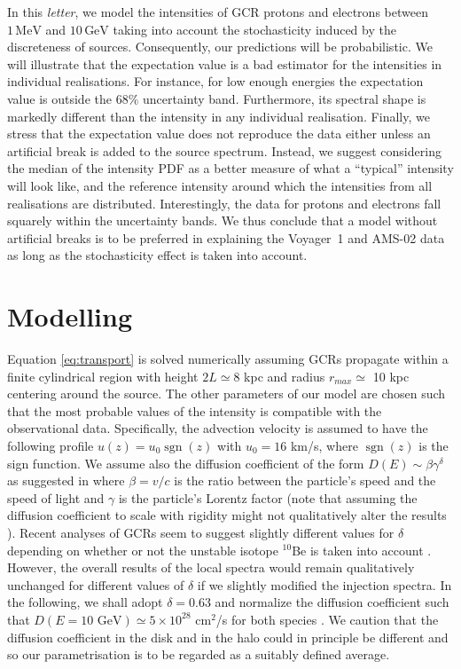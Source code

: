 \documentclass[%
reprint,
amsmath,amssymb,
aps,
superscriptaddress,
preprintnumbers
]{revtex4-2}
\DeclareMathOperator{\sgn}{sgn}
\begin{document}
In this \emph{letter}, we model the intensities of GCR protons and electrons between $1 \, \text{MeV}$ and $10 \, \text{GeV}$ taking into account the stochasticity induced by the discreteness of sources. Consequently, our predictions will be probabilistic. We will illustrate that the expectation value is a bad estimator for the intensities in individual realisations. For instance, for low enough energies the expectation value is outside the $68\%$ uncertainty band. Furthermore, its spectral shape is markedly different than the intensity in any individual realisation. Finally, we stress that the expectation value does not reproduce the data either unless an artificial break is added to the source spectrum. Instead, we suggest considering the median of the intensity PDF as a better measure of what a ``typical'' intensity will look like, and the reference intensity around which the intensities from all realisations are distributed. Interestingly, the data for protons and electrons fall squarely within the uncertainty bands. We thus conclude that a model without artificial breaks is to be preferred in explaining the Voyager~1 and AMS-02 data as long as the stochasticity effect is taken into account.


\section{Modelling}
\label{sec:stochastic}

Equation \ref{eq:transport} is solved numerically assuming GCRs propagate within a finite cylindrical region with height $2L\simeq 8$ kpc and radius $r_{max}\simeq$ 10 kpc centering around the source. The other parameters of our model are chosen such that the most probable values of the intensity is compatible with the observational data. Specifically, the advection velocity is assumed to have the following profile $u(z)=u_0\sgn(z)$ with $u_0=16$ km/s, where $\sgn(z)$ is the sign function. We assume also the diffusion coefficient of the form $D(E)\sim \beta\gamma^{\delta}$ as suggested in \citep{schlickeiser2010} where $\beta=v/c$ is the ratio between the particle's speed and the speed of light and $\gamma$ is the particle's Lorentz factor (note that assuming the diffusion coefficient to scale with rigidity might not qualitatively alter the results \cite{Note1}). 
Recent analyses of GCRs seem to suggest slightly different values for $\delta$ depending on whether or not the unstable isotope $^{10}$Be is taken into account \cite{evoli2019,evoli2020,weinrich2020}. However, the overall results of the local spectra would remain qualitatively unchanged for different values of $\delta$ if we slightly modified the injection spectra. In the following, we shall adopt $\delta=0.63$ and normalize the diffusion coefficient such that $D(E=10\textrm{ GeV})\simeq 5\times 10^{28}$ cm$^2$/s for both species \citep{evoli2019}. We caution that the diffusion coefficient in the disk and in the halo could in principle be different and so our parametrisation is to be regarded as a suitably defined average. 
\end{document}
